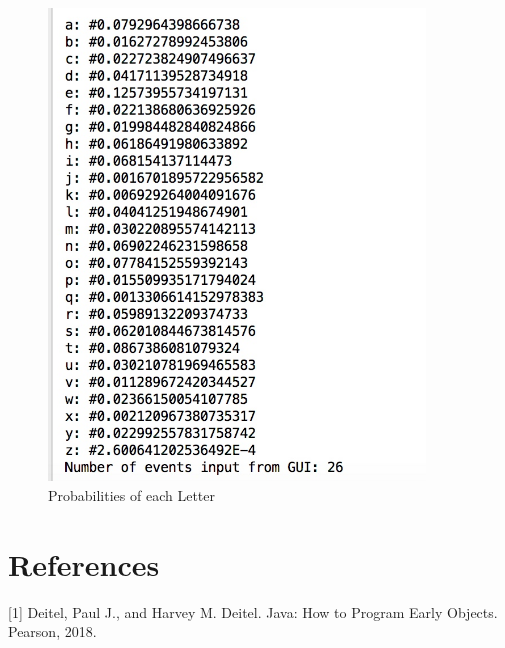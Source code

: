 \documentclass[a4paper,12pt]{article}
\begin{document}
\begin{figure}[H]
   \centering
   \includegraphics[width = 10cm]{OutputProbabilities} %
   \caption{Probabilities of each Letter}
   \label{OutputProbabilities}
\end{figure}




\newpage
\section{References}
[1]  Deitel, Paul J., and Harvey M. Deitel. Java: How to Program Early Objects. Pearson, 2018.
\end{document}
